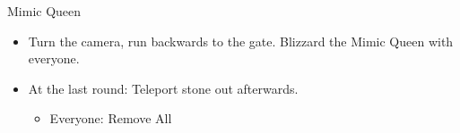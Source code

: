 \begin{battle}{Mimic Queen}
	\begin{itemize}
		\item Turn the camera, run backwards to the gate. Blizzard the Mimic Queen with everyone.
		\item At the last round: Teleport stone out afterwards.
		      \begin{equip}
			      \begin{itemize}
				      \item Everyone: Remove All
			      \end{itemize}
		      \end{equip}
	\end{itemize}
\end{battle}